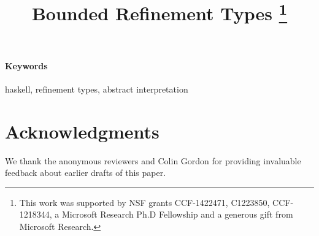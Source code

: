 \documentclass{sigplanconf}
\title{Bounded Refinement Types
\thanks{This work was supported by NSF grants CCF-1422471, C1223850, CCF-1218344,
        a Microsoft Research Ph.D Fellowship and a generous gift from Microsoft
        Research.}\ifextended{\\ Supplementary Material}{}}
\renewcommand{\keywords}{\paragraph*{Keywords}}
\begin{document}
\toappear{}
\maketitle

\begin{abstract}

\end{abstract}



\keywords
haskell, refinement types, abstract interpretation










\section*{Acknowledgments}
We thank the anonymous reviewers and Colin Gordon for providing invaluable feedback
about earlier drafts of this paper.

{


}
\end{document}
